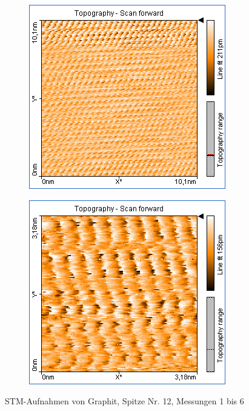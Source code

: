 \begin{figure}
\begin{subfigure}[b]{\picwidth}
        \caption{}
        \label{fig:graphit_06_04}
    \end{subfigure}
    \begin{subfigure}[b]{\picwidth}
        \includegraphics[width=\textwidth]{data/Graphit/pic_06_05_10nm}
        \caption{}
        \label{fig:graphit_06_05}
    \end{subfigure}\qquad
    \begin{subfigure}[b]{\picwidth}
        \includegraphics[width=\textwidth]{data/Graphit/pic_06_06_3nm}
        \caption{}
        \label{fig:graphit_06_06}
    \end{subfigure}
    \caption{STM-Aufnahmen von Graphit, Spitze Nr. 12, Messungen 1 bis 6}\label{fig:graphit_06}
\end{figure}
